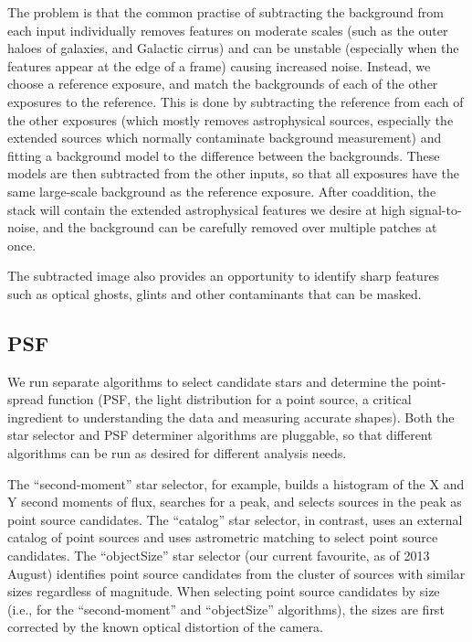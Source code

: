 \documentclass[12pt]{article}
\begin{document}
The problem is that the common practise of subtracting the background from each input individually removes
features on moderate scales (such as the outer haloes of galaxies, and Galactic cirrus) and can be unstable
(especially when the features appear at the edge of a frame) causing increased noise.  Instead, we choose a
reference exposure, and match the backgrounds of each of the other exposures to the reference.  This is done
by subtracting the reference from each of the other exposures (which mostly removes astrophysical sources,
especially the extended sources which normally contaminate background measurement) and fitting a background
model to the difference between the backgrounds.  These models are then subtracted from the other inputs, so
that all exposures have the same large-scale background as the reference exposure.  After coaddition, the
stack will contain the extended astrophysical features we desire at high signal-to-noise, and the background
can be carefully removed over multiple patches at once.

The subtracted image also provides an opportunity to identify sharp features such as optical ghosts, glints
and other contaminants that can be masked.

\subsection{PSF}

We run separate algorithms to select candidate stars and determine the point-spread function (PSF, the light
distribution for a point source, a critical ingredient to understanding the data and measuring accurate
shapes).  Both the star selector and PSF determiner algorithms are pluggable, so that different algorithms can
be run as desired for different analysis needs.

The ``second-moment'' star selector, for example, builds a histogram of the X and Y second moments of flux,
searches for a peak, and selects sources in the peak as point source candidates.  The ``catalog'' star
selector, in contrast, uses an external catalog of point sources and uses astrometric matching to select point
source candidates.  The ``objectSize'' star selector (our current favourite, as of 2013 August) identifies
point source candidates from the cluster of sources with similar sizes regardless of magnitude.  When
selecting point source candidates by size (i.e., for the ``second-moment'' and ``objectSize'' algorithms), the
sizes are first corrected by the known optical distortion of the camera.
\end{document}
